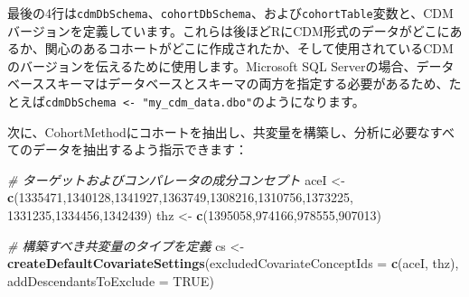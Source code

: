 \documentclass[
  11pt]{book}
\newenvironment{Shaded}{\begin{snugshade}}{\end{snugshade}}
\newcommand{\AttributeTok}[1]{\textcolor[rgb]{0.13,0.29,0.53}{#1}}
\newcommand{\CommentTok}[1]{\textcolor[rgb]{0.56,0.35,0.01}{\textit{#1}}}
\newcommand{\ConstantTok}[1]{\textcolor[rgb]{0.56,0.35,0.01}{#1}}
\newcommand{\DecValTok}[1]{\textcolor[rgb]{0.00,0.00,0.81}{#1}}
\newcommand{\FunctionTok}[1]{\textcolor[rgb]{0.13,0.29,0.53}{\textbf{#1}}}
\newcommand{\NormalTok}[1]{#1}
\newcommand{\OtherTok}[1]{\textcolor[rgb]{0.56,0.35,0.01}{#1}}
\theoremstyle{definition}
\theoremstyle{definition}
\theoremstyle{definition}
\theoremstyle{definition}
\theoremstyle{remark}
\begin{document}
最後の4行は\texttt{cdmDbSchema}、\texttt{cohortDbSchema}、および\texttt{cohortTable}変数と、CDMバージョンを定義しています。これらは後ほどRにCDM形式のデータがどこにあるか、関心のあるコホートがどこに作成されたか、そして使用されているCDMのバージョンを伝えるために使用します。Microsoft SQL Serverの場合、データベーススキーマはデータベースとスキーマの両方を指定する必要があるため、たとえば\texttt{cdmDbSchema\ \textless{}-\ "my\_cdm\_data.dbo"}のようになります。

次に、CohortMethodにコホートを抽出し、共変量を構築し、分析に必要なすべてのデータを抽出するよう指示できます：

\begin{Shaded}
\begin{Highlighting}[]
\CommentTok{\# ターゲットおよびコンパレータの成分コンセプト}
\NormalTok{aceI }\OtherTok{\textless{}{-}} \FunctionTok{c}\NormalTok{(}\DecValTok{1335471}\NormalTok{,}\DecValTok{1340128}\NormalTok{,}\DecValTok{1341927}\NormalTok{,}\DecValTok{1363749}\NormalTok{,}\DecValTok{1308216}\NormalTok{,}\DecValTok{1310756}\NormalTok{,}\DecValTok{1373225}\NormalTok{,}
          \DecValTok{1331235}\NormalTok{,}\DecValTok{1334456}\NormalTok{,}\DecValTok{1342439}\NormalTok{)}
\NormalTok{thz }\OtherTok{\textless{}{-}} \FunctionTok{c}\NormalTok{(}\DecValTok{1395058}\NormalTok{,}\DecValTok{974166}\NormalTok{,}\DecValTok{978555}\NormalTok{,}\DecValTok{907013}\NormalTok{)}

\CommentTok{\# 構築すべき共変量のタイプを定義}
\NormalTok{cs }\OtherTok{\textless{}{-}} \FunctionTok{createDefaultCovariateSettings}\NormalTok{(}\AttributeTok{excludedCovariateConceptIds =} \FunctionTok{c}\NormalTok{(aceI,}
\NormalTok{                                                                     thz),}
                                     \AttributeTok{addDescendantsToExclude =} \ConstantTok{TRUE}\NormalTok{)}


\end{Highlighting}
\end{Shaded}
\end{document}
